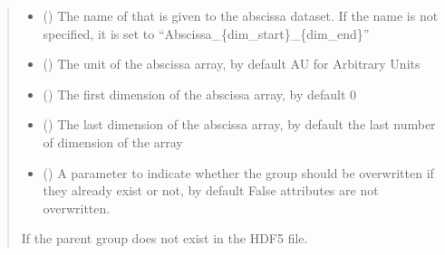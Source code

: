 \documentclass[letterpaper,10pt,english]{sphinxmanual}
\begin{document}
\begin{fulllineitems}
\begin{fulllineitems}
\begin{quote}
\begin{description}
\begin{itemize}
\item {} 
\sphinxAtStartPar
{} (\sphinxstyleliteralemphasis{\sphinxupquote{, }}) \textendash{} The name of that is given to the abscissa dataset. If the name is not specified, it is set to “Abscissa\_\{dim\_start\}\_\{dim\_end\}”

\item {} 
\sphinxAtStartPar
{} (\sphinxstyleliteralemphasis{\sphinxupquote{, }}) \textendash{} The unit of the abscissa array, by default AU for Arbitrary Units

\item {} 
\sphinxAtStartPar
{} (\sphinxstyleliteralemphasis{\sphinxupquote{, }}) \textendash{} The first dimension of the abscissa array, by default 0

\item {} 
\sphinxAtStartPar
{} (\sphinxstyleliteralemphasis{\sphinxupquote{, }}) \textendash{} The last dimension of the abscissa array, by default the last number of dimension of the array

\item {} 
\sphinxAtStartPar
{} (\sphinxstyleliteralemphasis{\sphinxupquote{, }}) \textendash{} A parameter to indicate whether the group should be overwritten if they already exist or not, by default False \sphinxhyphen{} attributes are not overwritten.

\end{itemize}

\sphinxAtStartPar
{\hyperref[\detokenize{source/HDF5_BLS:HDF5_BLS.WrapperError.WrapperError_StructureError}]{}} \textendash{} If the parent group does not exist in the HDF5 file.

\end{description}\end{quote}


\end{fulllineitems}
\end{fulllineitems}
\end{document}
